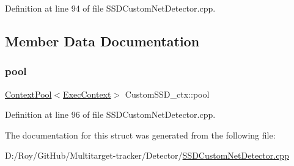 Definition at line 94 of file S\+S\+D\+Custom\+Net\+Detector.\+cpp.



\subsection{Member Data Documentation}
\mbox{\label{struct_custom_s_s_d__ctx_a2259ed0cb6edcac14eddb309d061c7f3}} 
\subsubsection{\texorpdfstring{pool}{pool}}
{\footnotesize\ttfamily \mbox{\hyperlink{common_8h_a59ab5d85bff9594312b035d548be298f}{Context\+Pool}}$<$\mbox{\hyperlink{class_exec_context}{Exec\+Context}}$>$ Custom\+S\+S\+D\+\_\+ctx\+::pool}



Definition at line 96 of file S\+S\+D\+Custom\+Net\+Detector.\+cpp.



The documentation for this struct was generated from the following file\+:\begin{DoxyCompactItemize}
\item 
D\+:/\+Roy/\+Git\+Hub/\+Multitarget-\/tracker/\+Detector/\mbox{\hyperlink{_s_s_d_custom_net_detector_8cpp}{S\+S\+D\+Custom\+Net\+Detector.\+cpp}}\end{DoxyCompactItemize}
